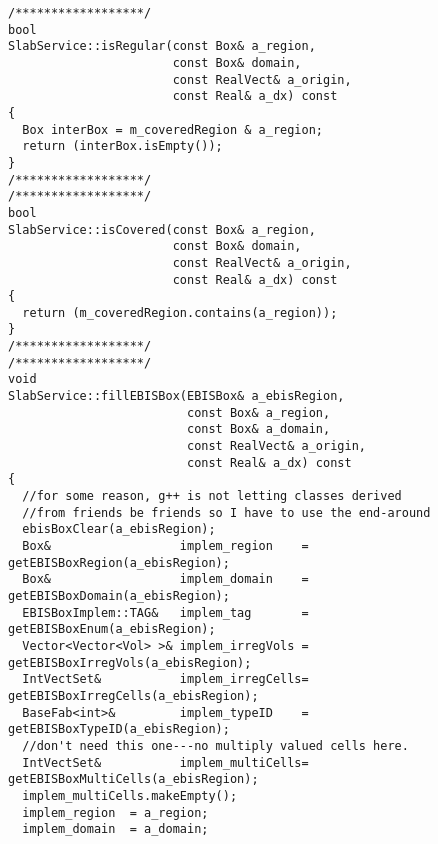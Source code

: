 \begin{small}
\begin{verbatim}
/******************/
bool 
SlabService::isRegular(const Box& a_region,
                       const Box& domain,
                       const RealVect& a_origin,
                       const Real& a_dx) const
{
  Box interBox = m_coveredRegion & a_region;
  return (interBox.isEmpty());
}
/******************/
/******************/
bool 
SlabService::isCovered(const Box& a_region,
                       const Box& domain,
                       const RealVect& a_origin,
                       const Real& a_dx) const
{
  return (m_coveredRegion.contains(a_region));
}
/******************/
/******************/
void 
SlabService::fillEBISBox(EBISBox& a_ebisRegion, 
                         const Box& a_region, 
                         const Box& a_domain, 
                         const RealVect& a_origin, 
                         const Real& a_dx) const
{
  //for some reason, g++ is not letting classes derived
  //from friends be friends so I have to use the end-around
  ebisBoxClear(a_ebisRegion);
  Box&                  implem_region    = getEBISBoxRegion(a_ebisRegion);
  Box&                  implem_domain    = getEBISBoxDomain(a_ebisRegion);
  EBISBoxImplem::TAG&   implem_tag       = getEBISBoxEnum(a_ebisRegion);
  Vector<Vector<Vol> >& implem_irregVols = getEBISBoxIrregVols(a_ebisRegion);
  IntVectSet&           implem_irregCells= getEBISBoxIrregCells(a_ebisRegion);
  BaseFab<int>&         implem_typeID    = getEBISBoxTypeID(a_ebisRegion);
  //don't need this one---no multiply valued cells here.
  IntVectSet&           implem_multiCells= getEBISBoxMultiCells(a_ebisRegion);
  implem_multiCells.makeEmpty();
  implem_region  = a_region;
  implem_domain  = a_domain;
  

\end{verbatim}
\end{small}
